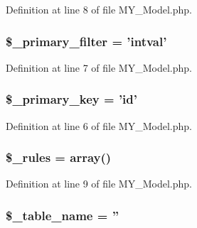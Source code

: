 Definition at line 8 of file M\-Y\-\_\-\-Model.\-php.

\hypertarget{class_m_y___model_a46d38cf0c97ee3e0a37dee799457bd14}{
\subsubsection[{\$\-\_\-primary\-\_\-filter}]{\setlength{\rightskip}{0pt plus 5cm}\$\-\_\-primary\-\_\-filter = 'intval'\hspace{0.3cm}{\ttfamily [protected]}}}\label{class_m_y___model_a46d38cf0c97ee3e0a37dee799457bd14}


Definition at line 7 of file M\-Y\-\_\-\-Model.\-php.

\hypertarget{class_m_y___model_a1befeb0c72587cd2574cd7d1818d66b8}{
\subsubsection[{\$\-\_\-primary\-\_\-key}]{\setlength{\rightskip}{0pt plus 5cm}\$\-\_\-primary\-\_\-key = 'id'\hspace{0.3cm}{\ttfamily [protected]}}}\label{class_m_y___model_a1befeb0c72587cd2574cd7d1818d66b8}


Definition at line 6 of file M\-Y\-\_\-\-Model.\-php.

\hypertarget{class_m_y___model_a2432b65e7e8b8a8328a1c47ab6ca0409}{
\subsubsection[{\$\-\_\-rules}]{\setlength{\rightskip}{0pt plus 5cm}\$\-\_\-rules = array()\hspace{0.3cm}{\ttfamily [protected]}}}\label{class_m_y___model_a2432b65e7e8b8a8328a1c47ab6ca0409}


Definition at line 9 of file M\-Y\-\_\-\-Model.\-php.

\hypertarget{class_m_y___model_a90ebc25e748e2696e00b5c5cf3255ee4}{
\subsubsection[{\$\-\_\-table\-\_\-name}]{\setlength{\rightskip}{0pt plus 5cm}\$\-\_\-table\-\_\-name = ''\hspace{0.3cm}{\ttfamily [protected]}}}\label{class_m_y___model_a90ebc25e748e2696e00b5c5cf3255ee4}


